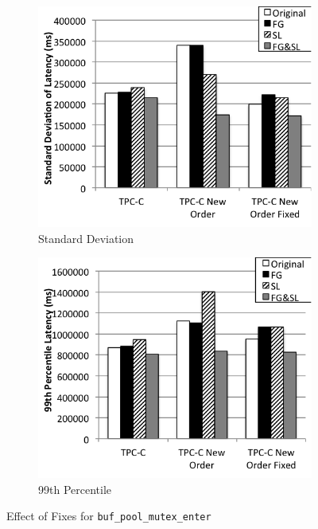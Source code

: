 \begin{figure}
\begin{subfigure}[t]{0.24\textwidth}
        \includegraphics[width=\textwidth]{plots/ours/std}
        \caption{Standard Deviation}
        \label{fig:fix-std-mean}
    \end{subfigure}
    \begin{subfigure}[t]{0.24\textwidth}
        \includegraphics[width=\textwidth]{plots/ours/99}
        \caption{99th Percentile}
        \label{fig:fix-99-mean}
    \end{subfigure}
    \caption{Effect of Fixes for \texttt{buf\_pool\_mutex\_enter}}
    \label{fig:fixes}
\end{figure}


